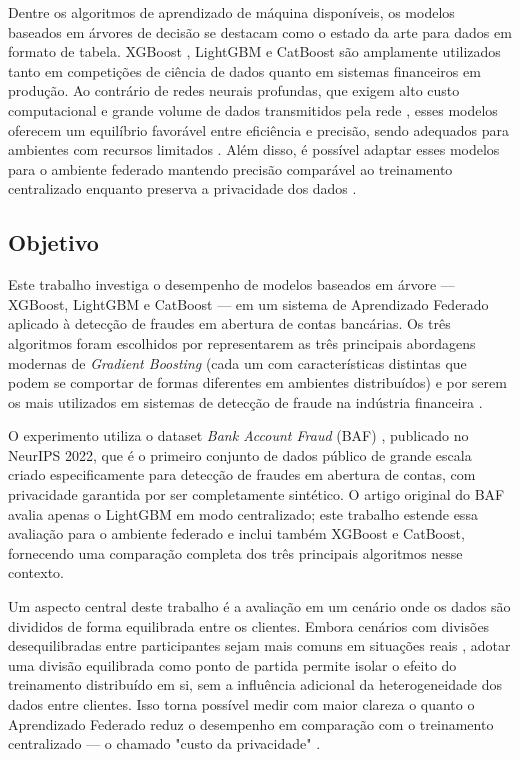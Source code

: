 Dentre os algoritmos de aprendizado de máquina disponíveis, os modelos baseados em árvores de decisão se destacam como o estado da arte para dados em formato de tabela. XGBoost \cite{chen2016xgboost}, LightGBM \cite{ke2017lightgbm} e CatBoost \cite{prokhorenkova2018catboost} são amplamente utilizados tanto em competições de ciência de dados quanto em sistemas financeiros em produção. Ao contrário de redes neurais profundas, que exigem alto custo computacional e grande volume de dados transmitidos pela rede \cite{konecny2016communication}, esses modelos oferecem um equilíbrio favorável entre eficiência e precisão, sendo adequados para ambientes com recursos limitados \cite{li2020practical, li2023fedtree}. Além disso, é possível adaptar esses modelos para o ambiente federado mantendo precisão comparável ao treinamento centralizado enquanto preserva a privacidade dos dados \cite{cheng2021secureboost}.

\subsection{Objetivo}

Este trabalho investiga o desempenho de modelos baseados em árvore --- XGBoost, LightGBM e CatBoost --- em um sistema de Aprendizado Federado aplicado à detecção de fraudes em abertura de contas bancárias. Os três algoritmos foram escolhidos por representarem as três principais abordagens modernas de \textit{Gradient Boosting} (cada um com características distintas que podem se comportar de formas diferentes em ambientes distribuídos) e por serem os mais utilizados em sistemas de detecção de fraude na indústria financeira \cite{cheng2021secureboost, kennedy2025financial}.

O experimento utiliza o dataset \textit{Bank Account Fraud} (BAF) \cite{jesus2022baf}, publicado no NeurIPS 2022, que é o primeiro conjunto de dados público de grande escala criado especificamente para detecção de fraudes em abertura de contas, com privacidade garantida por ser completamente sintético. O artigo original do BAF avalia apenas o LightGBM em modo centralizado; este trabalho estende essa avaliação para o ambiente federado e inclui também XGBoost e CatBoost, fornecendo uma comparação completa dos três principais algoritmos nesse contexto.

Um aspecto central deste trabalho é a avaliação em um cenário onde os dados são divididos de forma equilibrada entre os clientes. Embora cenários com divisões desequilibradas entre participantes sejam mais comuns em situações reais \cite{zhu2021noniid, li2020fedprox}, adotar uma divisão equilibrada como ponto de partida permite isolar o efeito do treinamento distribuído em si, sem a influência adicional da heterogeneidade dos dados entre clientes. Isso torna possível medir com maior clareza o quanto o Aprendizado Federado reduz o desempenho em comparação com o treinamento centralizado --- o chamado "custo da privacidade" \cite{wei2020privacy}.

